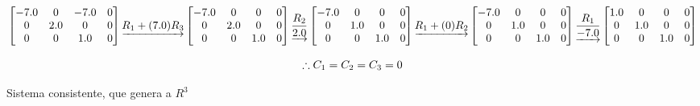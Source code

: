 \documentclass[
  11,
]{article}
\begin{document}
\[\left[\begin{matrix}-7.0 & 0 & -7.0 & 0\\0 & 2.0 & 0 & 0\\0 & 0 & 1.0 & 0\end{matrix}\right]
\underrightarrow{ R_1 + (7.0)R_3 }
\\
\left[\begin{matrix}-7.0 & 0 & 0 & 0\\0 & 2.0 & 0 & 0\\0 & 0 & 1.0 & 0\end{matrix}\right]
\underrightarrow{ \frac{R_2}{2.0} }
\left[\begin{matrix}-7.0 & 0 & 0 & 0\\0 & 1.0 & 0 & 0\\0 & 0 & 1.0 & 0\end{matrix}\right]
\underrightarrow{ R_1 + (0)R_2 }
\\
\left[\begin{matrix}-7.0 & 0 & 0 & 0\\0 & 1.0 & 0 & 0\\0 & 0 & 1.0 & 0\end{matrix}\right]
\underrightarrow{ \frac{R_1}{-7.0} }
\left[\begin{matrix}1.0 & 0 & 0 & 0\\0 & 1.0 & 0 & 0\\0 & 0 & 1.0 & 0\end{matrix}\right]
  \]

\[
   \therefore \\
   C_1 = C_2 = C_3 = 0
  \]

Sistema consistente, que genera a \(R^3\)
\end{document}
